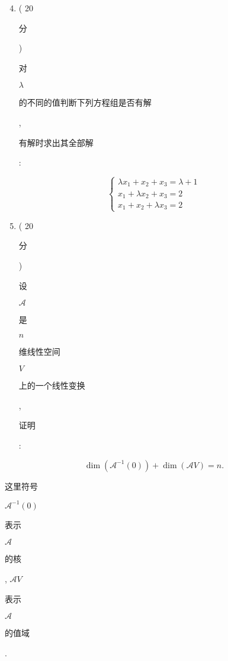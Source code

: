\documentclass[10pt]{article}
\begin{document}
\begin{enumerate}
  \setcounter{enumi}{3}
  \item ( 20 \begin{CJK}{UTF8}{mj}分\end{CJK}) \begin{CJK}{UTF8}{mj}对\end{CJK} $\lambda$ \begin{CJK}{UTF8}{mj}的不同的值判断下列方程组是否有解\end{CJK}, \begin{CJK}{UTF8}{mj}有解时求出其全部解\end{CJK}:
\end{enumerate}
$$
\left\{\begin{array}{l}
\lambda x_{1}+x_{2}+x_{3}=\lambda+1 \\
x_{1}+\lambda x_{2}+x_{3}=2 \\
x_{1}+x_{2}+\lambda x_{3}=2
\end{array}\right.
$$

\begin{enumerate}
  \setcounter{enumi}{4}
  \item ( 20 \begin{CJK}{UTF8}{mj}分\end{CJK}) \begin{CJK}{UTF8}{mj}设\end{CJK} $\mathscr{A}$ \begin{CJK}{UTF8}{mj}是\end{CJK} $n$ \begin{CJK}{UTF8}{mj}维线性空间\end{CJK} $V$ \begin{CJK}{UTF8}{mj}上的一个线性变换\end{CJK}, \begin{CJK}{UTF8}{mj}证明\end{CJK}:
\end{enumerate}
$$
\operatorname{dim}\left(\mathscr{A}^{-1}(0)\right)+\operatorname{dim}(\mathscr{A} V)=n .
$$
\begin{CJK}{UTF8}{mj}这里符号\end{CJK} $\mathscr{A}^{-1}(0)$ \begin{CJK}{UTF8}{mj}表示\end{CJK} $\mathscr{A}$ \begin{CJK}{UTF8}{mj}的核\end{CJK}, $\mathscr{A} V$ \begin{CJK}{UTF8}{mj}表示\end{CJK} $\mathscr{A}$ \begin{CJK}{UTF8}{mj}的值域\end{CJK}.
\end{document}
